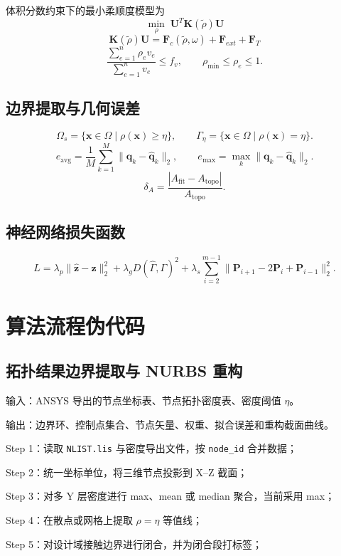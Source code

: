 \documentclass{FRB-style}
\newcommand{\codepath}[1]{\texttt{#1}}
\begin{document}
体积分数约束下的最小柔顺度模型为
\[
\min_{\rho}\;\mathbf{U}^{T}\mathbf{K}(\tilde{\rho})\mathbf{U}
\]
\[
\mathbf{K}(\tilde{\rho})\mathbf{U}=\mathbf{F}_c(\tilde{\rho},\omega)+\mathbf{F}_{ext}+\mathbf{F}_T
\]
\[
\frac{\sum_{e=1}^{n}\rho_e v_e}{\sum_{e=1}^{n}v_e}\le f_v,
\qquad
\rho_{\min}\le\rho_e\le1.
\]

\subsection{边界提取与几何误差}

\[
\Omega_s=\{\mathbf{x}\in\Omega\mid\rho(\mathbf{x})\ge\eta\},\qquad
\Gamma_\eta=\{\mathbf{x}\in\Omega\mid\rho(\mathbf{x})=\eta\}.
\]
\[
e_{\mathrm{avg}}=\frac{1}{M}\sum_{k=1}^{M}\|\mathbf{q}_k-\hat{\mathbf{q}}_k\|_2,
\qquad
e_{\max}=\max_k\|\mathbf{q}_k-\hat{\mathbf{q}}_k\|_2.
\]
\[
\delta_A=\frac{|A_{\mathrm{fit}}-A_{\mathrm{topo}}|}{A_{\mathrm{topo}}}.
\]

\subsection{神经网络损失函数}

\[
L=\lambda_p\|\hat{\mathbf{z}}-\mathbf{z}\|_2^2+
\lambda_gD(\hat{\Gamma},\Gamma)^2+
\lambda_s\sum_{i=2}^{m-1}\|\mathbf{P}_{i+1}-2\mathbf{P}_i+\mathbf{P}_{i-1}\|_2^2.
\]

\section{算法流程伪代码}

\subsection{拓扑结果边界提取与 NURBS 重构}

输入：ANSYS 导出的节点坐标表、节点拓扑密度表、密度阈值 $\eta$。

输出：边界环、控制点集合、节点矢量、权重、拟合误差和重构截面曲线。

\noindent Step 1：读取 \codepath{NLIST.lis} 与密度导出文件，按 \codepath{node\_id} 合并数据；

\noindent Step 2：统一坐标单位，将三维节点投影到 X--Z 截面；

\noindent Step 3：对多 Y 层密度进行 max、mean 或 median 聚合，当前采用 max；

\noindent Step 4：在散点或网格上提取 $\rho=\eta$ 等值线；

\noindent Step 5：对设计域接触边界进行闭合，并为闭合段打标签；
\end{document}
